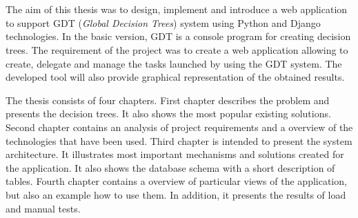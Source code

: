 \chapter*{}
 

The aim of this thesis was to design, implement and introduce a web application to support GDT (\textit{Global Decision Trees}) system using Python and Django technologies. In the basic version, GDT is a console program for creating decision trees. The requirement of the project was to create a web application allowing to create, delegate and manage the tasks launched by using the GDT system. The developed tool will also provide graphical representation of the obtained results.

The thesis consists of four chapters. First chapter describes the problem and presents the decision trees. It also shows the most popular existing solutions. Second chapter contains an analysis of project requirements and a overview of the technologies that have been used. Third chapter is intended to present the system architecture. It illustrates most important mechanisms and solutions created for the application. It also shows the database schema with a short description of tables. Fourth chapter contains a overview of particular views of the application, but also an example how to use them. In addition, it presents the results of load and manual tests.
